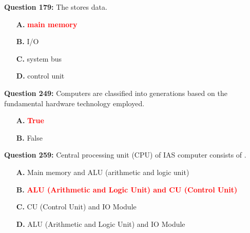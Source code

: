 \documentclass[12pt,a4paper]{article}
\begin{document}
\textbf{Question 179:} The \underline{\hspace{1.5cm}} stores data.

\begin{itemize}
    \item[\textbf{A.}] \textcolor{red}{\textbf{main memory}}
    \item[\textbf{B.}] I/O
    \item[\textbf{C.}] system bus
    \item[\textbf{D.}] control unit
\end{itemize}

\vspace{0.5cm}

\vspace{0.5cm}

\vspace{0.5cm}

\vspace{0.5cm}

\vspace{0.5cm}

\vspace{0.5cm}

\vspace{0.5cm}

\vspace{0.5cm}

\textbf{Question 249:} Computers are classified into generations based on the fundamental hardware technology employed.

\begin{itemize}
    \item[\textbf{A.}] \textcolor{red}{\textbf{True}}
    \item[\textbf{B.}] False
\end{itemize}

\vspace{0.5cm}

\vspace{0.5cm}

\textbf{Question 259:} Central processing unit (CPU) of IAS computer consists of \underline{\hspace{1.5cm}}.

\begin{itemize}
    \item[\textbf{A.}] Main memory and ALU (arithmetic and logic unit)
    \item[\textbf{B.}] \textcolor{red}{\textbf{ALU (Arithmetic and Logic Unit) and CU (Control Unit)}}
    \item[\textbf{C.}] CU (Control Unit) and IO Module
    \item[\textbf{D.}] ALU (Arithmetic and Logic Unit) and IO Module
\end{itemize}
\end{document}
